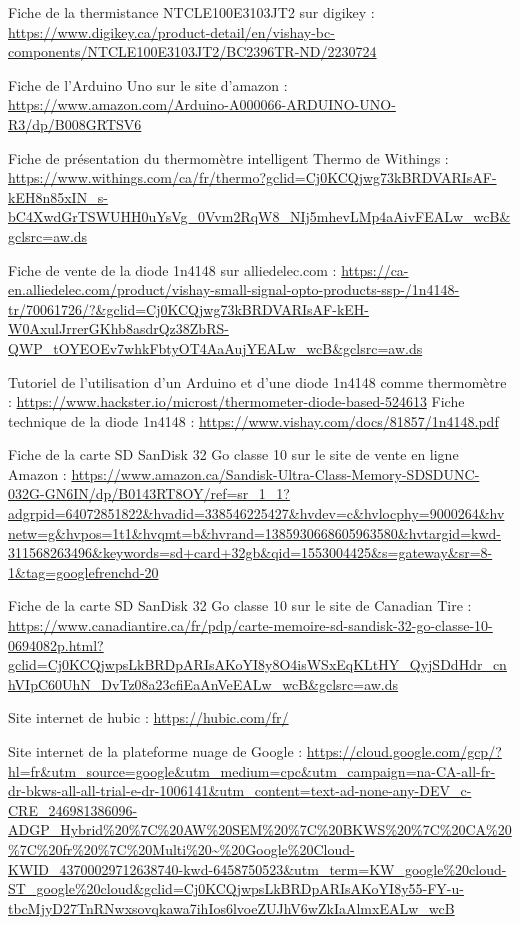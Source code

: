 \begin{thebibliographyUL}{9}
 Fiche de la thermistance NTCLE100E3103JT2 sur digikey :
\url{https://www.digikey.ca/product-detail/en/vishay-bc-components/NTCLE100E3103JT2/BC2396TR-ND/2230724}

Fiche de l’Arduino Uno sur le site d’amazon :
\url{https://www.amazon.com/Arduino-A000066-ARDUINO-UNO-R3/dp/B008GRTSV6}

Fiche de présentation du thermomètre intelligent Thermo de Withings :
\url{https://www.withings.com/ca/fr/thermo?gclid=Cj0KCQjwg73kBRDVARIsAF-kEH8n85xIN_s-bC4XwdGrTSWUHH0uYsVg_0Vvm2RqW8_NIj5mhevLMp4aAivFEALw_wcB&gclsrc=aw.ds}

 Fiche de vente de la diode 1n4148 sur alliedelec.com :
\url{https://ca-en.alliedelec.com/product/vishay-small-signal-opto-products-ssp-/1n4148-tr/70061726/?&gclid=Cj0KCQjwg73kBRDVARIsAF-kEH-W0AxulJrrerGKhb8asdrQz38ZbRS-QWP_tOYEOEv7whkFbtyOT4AaAujYEALw_wcB&gclsrc=aw.ds}

 Tutoriel de l’utilisation d’un Arduino et d’une diode 1n4148 comme thermomètre :
\url{https://www.hackster.io/microst/thermometer-diode-based-524613}
 Fiche technique de la diode 1n4148 :
\url{https://www.vishay.com/docs/81857/1n4148.pdf}

 Fiche de la carte SD SanDisk 32 Go classe 10 sur le site de vente en ligne Amazon :
\url{https://www.amazon.ca/Sandisk-Ultra-Class-Memory-SDSDUNC-032G-GN6IN/dp/B0143RT8OY/ref=sr_1_1?adgrpid=64072851822&hvadid=338546225427&hvdev=c&hvlocphy=9000264&hvnetw=g&hvpos=1t1&hvqmt=b&hvrand=1385930668605963580&hvtargid=kwd-311568263496&keywords=sd+card+32gb&qid=1553004425&s=gateway&sr=8-1&tag=googlefrenchd-20}

 Fiche de la carte SD SanDisk 32 Go classe 10 sur le site de Canadian Tire :
\url{https://www.canadiantire.ca/fr/pdp/carte-memoire-sd-sandisk-32-go-classe-10-0694082p.html?gclid=Cj0KCQjwpsLkBRDpARIsAKoYI8y8O4isWSxEqKLtHY_QyjSDdHdr_cnhVIpC60UhN_DvTz08a23cfiEaAnVeEALw_wcB&gclsrc=aw.ds}

 Site internet de hubic :
\url{https://hubic.com/fr/}

 Site internet de la plateforme nuage de Google :
\url{https://cloud.google.com/gcp/?hl=fr&utm_source=google&utm_medium=cpc&utm_campaign=na-CA-all-fr-dr-bkws-all-all-trial-e-dr-1006141&utm_content=text-ad-none-any-DEV_c-CRE_246981386096-ADGP_Hybrid%20%7C%20AW%20SEM%20%7C%20BKWS%20%7C%20CA%20%7C%20fr%20%7C%20Multi%20~%20Google%20Cloud-KWID_43700029712638740-kwd-6458750523&utm_term=KW_google%20cloud-ST_google%20cloud&gclid=Cj0KCQjwpsLkBRDpARIsAKoYI8y55-FY-u-tbcMjyD27TnRNwxsovqkawa7ihIos6lvoeZUJhV6wZkIaAlmxEALw_wcB}


\end{thebibliographyUL}
